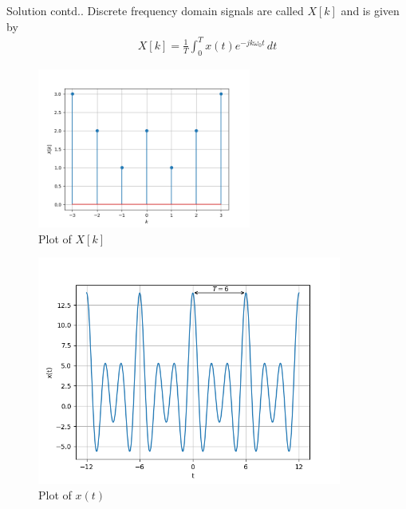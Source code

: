 \documentclass{beamer}
\begin{document}
\begin{frame}{Solution contd..}
Discrete frequency domain signals are called $X[k]$ and is given by
\begin{align}
    X[k]=\frac{1}{T}\int_{0}^{T}x(t)e^{-jk\omega_0t}\,dt
\end{align}
\begin{figure}[!h]
         \centering
         \includegraphics[width=7cm]{plot_X[k].png}
         \caption{Plot of $X[k]$}
         \label{plot}
\end{figure}
\end{frame}
\begin{frame}
\begin{figure}[!h]
         \centering
         \includegraphics[width=10cm]{plot_x(t).png}
         \caption{Plot of $x(t)$}
         \label{plot}
\end{figure}
\end{frame}
\end{document}
